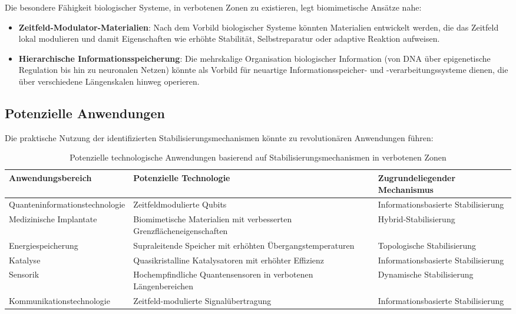 \documentclass[12pt,a4paper]{article}
\begin{document}
	Die besondere Fähigkeit biologischer Systeme, in verbotenen Zonen zu existieren, legt biomimetische Ansätze nahe:
	
	\begin{itemize}
		\item \textbf{Zeitfeld-Modulator-Materialien}: Nach dem Vorbild biologischer Systeme könnten Materialien entwickelt werden, die das Zeitfeld lokal modulieren und damit Eigenschaften wie erhöhte Stabilität, Selbstreparatur oder adaptive Reaktion aufweisen.
		
		\item \textbf{Hierarchische Informationsspeicherung}: Die mehrskalige Organisation biologischer Information (von DNA über epigenetische Regulation bis hin zu neuronalen Netzen) könnte als Vorbild für neuartige Informationsspeicher- und -verarbeitungssysteme dienen, die über verschiedene Längen\-skalen hinweg operieren.
	\end{itemize}
	
	\subsection{Potenzielle Anwendungen}
	\label{subsec:potenzielle_anwendungen}
	
	Die praktische Nutzung der identifizierten Stabilisierungs\-mechanismen könnte zu revolutionären Anwendungen führen:
	
	\begin{table}[h]
		\centering
		\begin{adjustbox}{scale=0.65}
			\begin{tabular}{lll}
				\hline
				\textbf{Anwendungsbereich} & \textbf{Potenzielle Technologie} & \textbf{Zugrundeliegender Mechanismus} \\
				\hline
				Quanteninformationstechnologie & Zeitfeldmodulierte Qubits & Informationsbasierte Stabilisierung \\
				Medizinische Implantate & Biomimetische Materialien mit verbesserten Grenzflächeneigenschaften & Hybrid-Stabilisierung \\
				Energiespeicherung & Supraleitende Speicher mit erhöhten Übergangstemperaturen & Topologische Stabilisierung \\
				Katalyse & Quasikristalline Katalysatoren mit erhöhter Effizienz & Informationsbasierte Stabilisierung \\
				Sensorik & Hochempfindliche Quantensensoren in verbotenen Längenbereichen & Dynamische Stabilisierung \\
				Kommunikationstechnologie & Zeitfeld-modulierte Signalübertragung & Informationsbasierte Stabilisierung \\
				\hline
			\end{tabular}
		\end{adjustbox}
		\caption{Potenzielle technologische Anwendungen basierend auf Stabilisierungsmechanismen in verbotenen Zonen}
		\label{tab:applications}
	\end{table}
	
\end{document}
